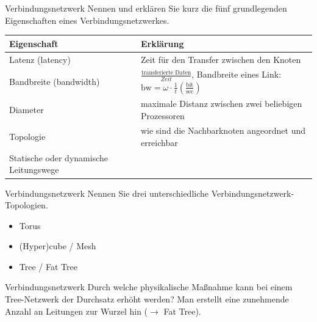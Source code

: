 \begin{aufgabe}{Verbindungsnetzwerk}
    Nennen und erklären Sie kurz die fünf grundlegenden Eigenschaften eines Verbindungsnetzwerkes.
    \tcblower
    \begin{tabularx}{\textwidth}{|l|X|}
        \toprule
        Eigenschaft            & Erklärung                                                                                                                                           \\
        \midrule
        Latenz (latency)       & Zeit für den Transfer zwischen den Knoten                                                                                                           \\
        \midrule
        Bandbreite (bandwidth) & $\frac{\text{transferierte Daten}}{Zeit}$, Bandbreite eines Link: $\text{bw} = \omega \cdot \frac{1}{t} \left(\frac{\text{bit}}{\text{sec}}\right)$ \\
        \midrule
        Diameter               & maximale Distanz zwischen zwei beliebigen Prozessoren                                                                                               \\
        \midrule
        Topologie              & wie sind die Nachbarknoten angeordnet und erreichbar                                                                                                \\
        \midrule
        Statische oder dynamische Leitungswege                                                                                                                                       \\
        \bottomrule
    \end{tabularx}
\end{aufgabe}

\begin{aufgabe}{Verbindungsnetzwerk}
    Nennen Sie drei unterschiedliche Verbindungsnetzwerk-Topologien.
    \tcblower
    \begin{itemize}
        \item Torus
        \item (Hyper)cube / Mesh
        \item Tree / Fat Tree
    \end{itemize}
\end{aufgabe}

\begin{aufgabe}{Verbindungsnetzwerk}
    Durch welche physikalische Maßnahme kann bei einem Tree-Netzwerk der Durchsatz erhöht werden?
    \tcblower
    Man erstellt eine zunehmende Anzahl an Leitungen zur Wurzel hin ($\to$ Fat Tree).
\end{aufgabe}

